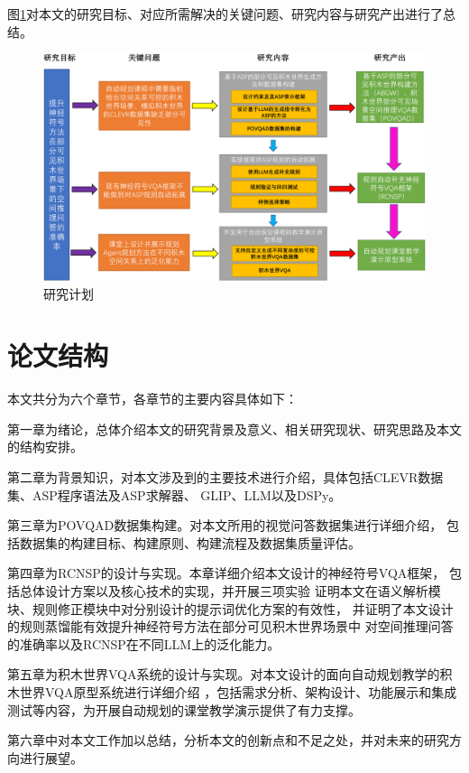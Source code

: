 图\ref{plan}对本文的研究目标、对应所需解决的关键问题、研究内容与研究产出进行了总结。
\begin{figure}[h]
    \centering
    \includegraphics[width=\textwidth]{figures/研究方法-crop.pdf}
    \caption{研究计划}
    \label{plan}
\end{figure}
\section{论文结构}
本文共分为六个章节，各章节的主要内容具体如下：

第一章为绪论，总体介绍本文的研究背景及意义、相关研究现状、研究思路及本文的结构安排。

第二章为背景知识，对本文涉及到的主要技术进行介绍，具体包括CLEVR数据集、ASP程序语法及ASP求解器、
GLIP、LLM以及DSPy。

第三章为POVQAD数据集构建。对本文所用的视觉问答数据集进行详细介绍，
包括数据集的构建目标、构建原则、构建流程及数据集质量评估。

第四章为RCNSP的设计与实现。本章详细介绍本文设计的神经符号VQA框架，
包括总体设计方案以及核心技术的实现，并开展三项实验
证明本文在语义解析模块、规则修正模块中对分别设计的提示词优化方案的有效性，
并证明了本文设计的规则蒸馏能有效提升神经符号方法在部分可见积木世界场景中
对空间推理问答的准确率以及RCNSP在不同LLM上的泛化能力。

第五章为积木世界VQA系统的设计与实现。对本文设计的面向自动规划教学的积木世界VQA原型系统进行详细介绍
，包括需求分析、架构设计、功能展示和集成测试等内容，为开展自动规划的课堂教学演示提供了有力支撑。

第六章中对本文工作加以总结，分析本文的创新点和不足之处，并对未来的研究方向进行展望。